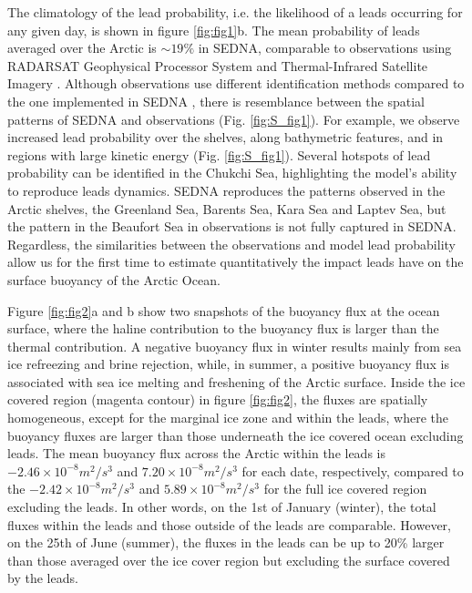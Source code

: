 \documentclass[lineno,sn-basic]{sn-jnl}%
\begin{document}
The climatology of the lead probability, i.e. the likelihood of a leads occurring for any given day, is shown in figure \ref{fig:fig1}b. The mean probability of leads averaged over the Arctic is $\sim 19\%$ in SEDNA, comparable to observations using RADARSAT Geophysical Processor System and Thermal-Infrared Satellite Imagery \citep{Wernecke_Lead_2015,Willmes_leads_currents_2023}. Although observations use different identification methods compared to the one implemented in SEDNA \citep{Hutter_identification_2019}, there is resemblance between the spatial patterns of SEDNA and observations (Fig. \ref{fig:S_fig1}). For example, we observe increased lead probability over the shelves, along bathymetric features, and in regions with large kinetic energy (Fig. \ref{fig:S_fig1}). Several hotspots of lead probability can be identified in the Chukchi Sea, highlighting the model's ability to reproduce leads dynamics. SEDNA reproduces the patterns observed in the Arctic shelves, the Greenland Sea, Barents Sea, Kara Sea and Laptev Sea, but the pattern in the Beaufort Sea in observations is not fully captured in SEDNA. Regardless, the similarities between the observations and model lead probability allow us for the first time to estimate quantitatively the impact leads have on the surface buoyancy of the Arctic Ocean.

Figure \ref{fig:fig2}a and b show two snapshots of the buoyancy flux at the ocean surface, where the haline contribution to the buoyancy flux is larger than the thermal contribution. A negative buoyancy flux in winter results mainly from sea ice refreezing and brine rejection, while, in summer, a positive buoyancy flux is associated with sea ice melting and freshening of the Arctic surface. Inside the ice covered region (magenta contour) in figure \ref{fig:fig2}, the fluxes are spatially homogeneous, except for the marginal ice zone and within the leads, where the buoyancy fluxes are larger than those underneath the ice covered ocean excluding leads. The mean buoyancy flux across the Arctic within the leads is $-2.46\times 10^{-8} m^2/s^3$ and $7.20\times 10^{-8} m^2/s^3$ for each date, respectively, compared to the $-2.42\times 10^{-8} m^2/s^3$ and $5.89\times 10^{-8} m^2/s^3$ for the full ice covered region excluding the leads. In other words, on the 1st of January (winter), the total fluxes within the leads and those outside of the leads are comparable. However, on the 25th of June (summer), the fluxes in the leads can be up to 20\% larger than those averaged over the ice cover region but excluding the surface covered by the leads.
\end{document}
